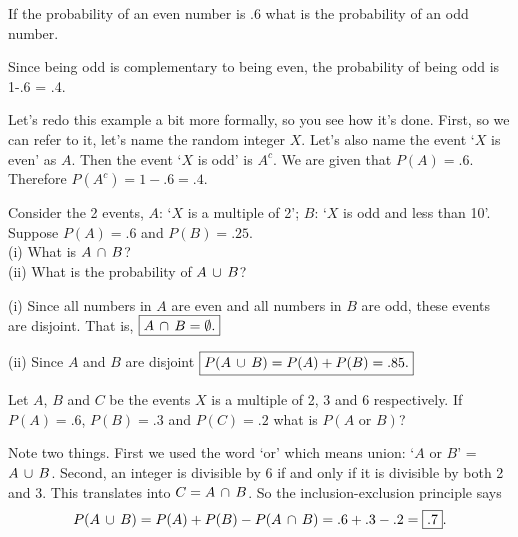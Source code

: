 \numexamp  If the probability of an even number is .6 what is the probability of an odd number.

\ans Since being odd is complementary to being even, the probability of being odd is 1-.6 = .4.

Let's redo this example a bit more formally, so you see how it's done.
First, so we can refer to it, let's name the random integer $X$. 
Let's also name the event `$X$ is even' as $A$. Then the event
`$X$ is odd' is $A^c$.
We are given that  $P(A) = .6$. Therefore $P(A^c) = 1-.6 = \boxed{.4}$.

\numexamp Consider the 2 events, $A$: `$X$ is a multiple of 2'; $B$: `$X$ is odd and less than 10'. Suppose $P(A)=.6$ and $P(B)=.25$.\\
(i) What is $A\,\cap\, B$?\\
(ii) What is the probability of $A\,\cup\, B$? 

\ans (i) Since all numbers in $A$ are even and all numbers in $B$ are odd, these events are disjoint. That is, $\boxed{A\,\cap\, B = \emptyset.}$

(ii) Since $A$ and $B$ are disjoint $\boxed{P(A\,\cup\, B) = P(A) + P(B) = .85.}$

\medskip

\numexamp Let $A$, $B$ and $C$ be the events $X$ is a multiple of 2, 3 and 6
respectively. If $P(A)=.6$, $P(B)=.3$ and $P(C)=.2$ what is $P(A \text{ or } B)$?

\ans Note two things. First we used the word `or' which means union:
 `$A$ or $B$' = $A\,\cup\, B$. 
Second, an integer is divisible by 6 if and only if it is divisible by both 2 and 3.  This translates into $C = A\,\cap\, B$. So the inclusion-exclusion principle says 
\[ P(A\,\cup\, B) = P(A) +P(B) - P(A\,\cap\, B) = .6 + .3 - .2 = \boxed{.7}.\]
\endtopic
